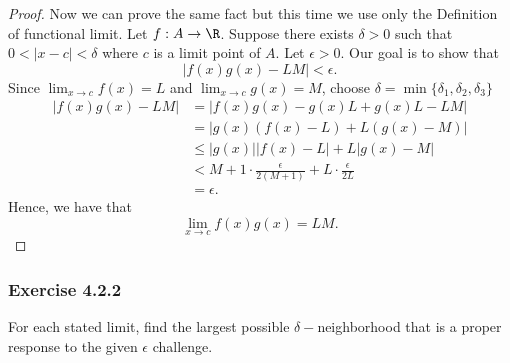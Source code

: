 \begin{enumerate}
\begin{proof}
    Now we can prove the same fact but this time we use only the Definition of functional limit.
    Let \( f: A \to \R  \). Suppose there exists \( \delta > 0  \) such that \( 0 < | x - c  | < \delta  \) where \( c  \) is a limit point of \( A  \). Let \( \epsilon > 0  \). Our goal is to show that 
    \[ | f(x)g(x) - LM  | < \epsilon. \]
    Since \( \lim_{ x \to c } f(x) = L  \) and \( \lim_{ x  \to c } g(x) = M  \), choose \( \delta = \min \{  \delta_1, \delta_2, \delta_3  \}  \) 
    \begin{align*}
        | f(x)g(x) - LM  | &= | f(x)g(x) - g(x)L + g(x)L - LM |  \\
                           &= | g(x)(f(x) - L ) + L (g(x) - M)  | \\ 
                           &\leq | g(x) | | f(x) - L  | + L | g(x) - M  |   \\
                           &< M + 1 \cdot \frac{ \epsilon  }{ 2(M + 1)  } + L \cdot \frac{ \epsilon  }{ 2L  } \\
                           &= \epsilon.
    \end{align*}
    Hence, we have that 
    \[  \lim_{ x \to c } f(x)g(x) = L M. \]
    \end{proof}
\end{enumerate}


\subsubsection{Exercise 4.2.2} For each stated limit, find the largest possible \( \delta- \)neighborhood that is a proper response to the given \( \epsilon  \) challenge.

